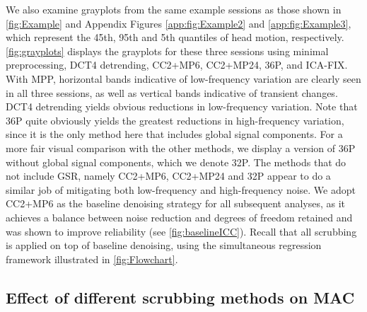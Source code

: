 \documentclass{article}
\begin{document}
We also examine grayplots \citep{powerSimpleUsefulWay2017} from the same example sessions as those shown in \autoref{fig:Example} and Appendix Figures \ref{app:fig:Example2} and \ref{app:fig:Example3}, which represent the 45th, 95th and 5th quantiles of head motion, respectively. \autoref{fig:grayplots} displays the grayplots for these three sessions using minimal preprocessing, DCT4 detrending, CC2+MP6, CC2+MP24, 36P, and ICA-FIX. With MPP, horizontal bands indicative of low-frequency variation are clearly seen in all three sessions, as well as vertical bands indicative of transient changes. DCT4 detrending yields obvious reductions in low-frequency variation. Note that 36P quite obviously yields the greatest reductions in high-frequency variation, since it is the only method here that includes global signal components. For a more fair visual comparison with the other methods, we display a version of 36P without global signal components, which we denote 32P.   The methods that do not include GSR, namely CC2+MP6, CC2+MP24 and 32P appear to do a similar job of mitigating both low-frequency and high-frequency noise. We adopt CC2+MP6 as the baseline denoising strategy for all subsequent analyses, as it achieves a balance between noise reduction and degrees of freedom retained and was shown to improve reliability (see \autoref{fig:baselineICC}). Recall that all scrubbing is applied on top of baseline denoising, using the simultaneous regression framework illustrated in \autoref{fig:Flowchart}.

\subsection{Effect of different scrubbing methods on MAC}
\end{document}
